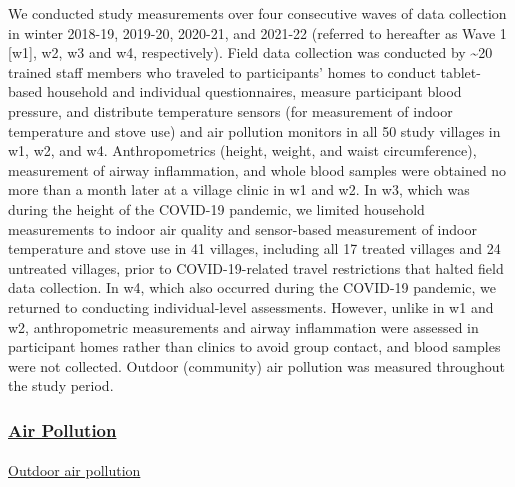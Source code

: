 \documentclass[
  letterpaper,
  DIV=11,
  numbers=noendperiod]{scrartcl}
\makeatletter
\let\oldparagraph\paragraph
\renewcommand{\paragraph}{ %
    \@ifstar %
      \xxxParagraphStar %
      \xxxParagraphNoStar %
  } %
\newcommand{\xxxParagraphStar}[1]{\oldparagraph*{#1}\mbox{}} %
\newcommand{\xxxParagraphNoStar}[1]{\oldparagraph{#1}\mbox{}} %
\providecommand{\DIFadd}[1]{{\protect\color{blue}\underline{#1}}} %
\providecommand{\DIFaddbegin}{} %
\providecommand{\DIFaddend}{} %
\providecommand{\DIFdelbegin}{} %
\providecommand{\DIFdelend}{} %
\newcommand{\DIFscaledelfig}{0.5}
\newlength{\DIFdelgraphicswidth} %
\newlength{\DIFdelgraphicsheight} %
\newcommand{\DIFaddincludegraphics}[2][]{{\color{blue}\fbox{\DIFOincludegraphics[#1]{#2}}}} %
\newcommand{\DIFdelincludegraphics}[2][]{%
\sbox{\DIFdelgraphicsbox}{\DIFOincludegraphics[#1]{#2}}%
\settoboxwidth{\DIFdelgraphicswidth}{\DIFdelgraphicsbox} %
\settoboxtotalheight{\DIFdelgraphicsheight}{\DIFdelgraphicsbox} %
\scalebox{\DIFscaledelfig}{%
\parbox[b]{\DIFdelgraphicswidth}{\usebox{\DIFdelgraphicsbox}\\[-\baselineskip] \rule{\DIFdelgraphicswidth}{0em}}\llap{\resizebox{\DIFdelgraphicswidth}{\DIFdelgraphicsheight}{%
\setlength{\unitlength}{\DIFdelgraphicswidth}%
\begin{picture}(1,1)%
\thicklines\linethickness{2pt} %
{\color[rgb]{1,0,0}\put(0,0){\framebox(1,1){}}}%
{\color[rgb]{1,0,0}\put(0,0){\line( 1,1){1}}}%
{\color[rgb]{1,0,0}\put(0,1){\line(1,-1){1}}}%
\end{picture}%
}\hspace*{3pt}}} %
} %
\DeclareRobustCommand{\DIFaddbegin}{\DIFOaddbegin \let\includegraphics\DIFaddincludegraphics} %
\DeclareRobustCommand{\DIFaddend}{\DIFOaddend \let\includegraphics\DIFOincludegraphics} %
\DeclareRobustCommand{\DIFdelbegin}{\DIFOdelbegin \let\includegraphics\DIFdelincludegraphics} %
\DeclareRobustCommand{\DIFdelend}{\DIFOaddend \let\includegraphics\DIFOincludegraphics} %
\makeatother
\begin{document}
We conducted study measurements over four consecutive waves of data
collection in winter 2018-19, 2019-20, 2020-21, and 2021-22 (referred to
hereafter as Wave 1 {[}w1{]}, w2, w3 and w4, respectively). Field data
collection was conducted by \textasciitilde20 trained staff members who
traveled to participants' homes to conduct tablet-based household and
individual questionnaires, measure participant blood pressure, and
distribute temperature sensors (for measurement of indoor temperature
and stove use) and air pollution monitors in all 50 study villages in
w1, w2, and w4. Anthropometrics (height, weight, and waist
circumference), measurement of airway inflammation, and whole blood
samples were obtained no more than a month later at a village clinic in
w1 and w2. In w3, which was during the height of the COVID-19 pandemic,
we limited household measurements to indoor air quality and sensor-based
measurement of indoor temperature and stove use in 41 villages,
including all 17 treated villages and 24 untreated villages, prior to
COVID-19-related travel restrictions that halted field data collection.
In w4, which also occurred during the COVID-19 pandemic, we returned to
conducting individual-level assessments. However, unlike in w1 and w2,
anthropometric measurements and airway inflammation were assessed in
participant homes rather than clinics to avoid group contact, and blood
samples were not collected. Outdoor (community) air pollution was
measured throughout the study period.

\DIFdelbegin %
\DIFdelend \DIFaddbegin \subsubsection{\DIFadd{Air Pollution}}\label{air-pollution}
\DIFaddend 

\DIFdelbegin %
\DIFdelend \DIFaddbegin \paragraph{\DIFadd{Outdoor air pollution}}\label{outdoor-air-pollution}
\DIFaddend 
\end{document}
